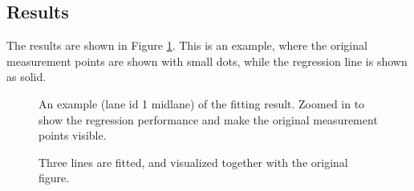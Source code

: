 \documentclass[sn-mathphys-num]{sn-jnl}%
\begin{document}
\subsection{Results}
The results are shown in Figure \ref{fig:fittedLines_zoomed}. This is an example, where the original measurement points are shown with small dots, while the regression line is shown as solid.
\begin{figure}[h]
    \caption{An example (lane id 1 midlane) of the fitting result. Zoomed in to show the regression performance and make the original measurement points visible.}
    \label{fig:fittedLines_zoomed}
\end{figure}

\begin{figure}[h]
    \caption{Three lines are fitted, and visualized together with the original figure.}
    \label{fig:fittedLines}
\end{figure}


\end{document}
